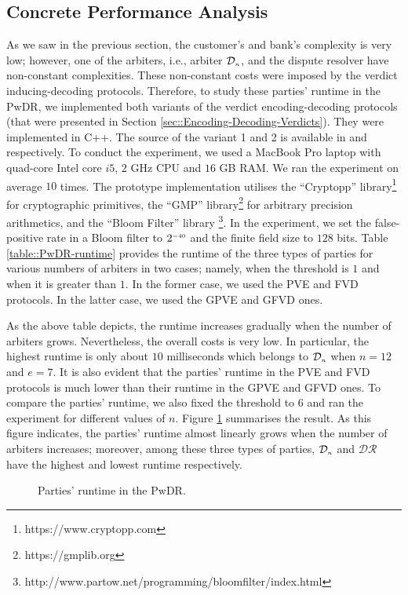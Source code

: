 \subsection{Concrete Performance Analysis}

As we saw  in the previous section, the customer's and bank's complexity is very low; however, one of the arbiters, i.e., arbiter $\mathcal{D}_{\scriptscriptstyle n}$, and the dispute resolver have non-constant complexities.  These non-constant  costs were  imposed by the verdict inducing-decoding protocols. Therefore, to study these parties' runtime in the PwDR, we  implemented both variants of the verdict encoding-decoding protocols (that were presented in Section  \ref{sec::Encoding-Decoding-Verdicts}). They  were implemented in C++. The source of the variant 1 and 2 is available in \cite{variant-1} and \cite{variant-2} respectively. To conduct the experiment, we used a MacBook Pro laptop with quad-core Intel core $i5$, $2$ GHz CPU and $16$ GB RAM. We ran the experiment on average $10$ times. The prototype implementation utilises the ``Cryptopp'' library\footnote{https://www.cryptopp.com}  for cryptographic primitives, the ``GMP'' library\footnote{https://gmplib.org} for arbitrary precision arithmetics, and the ``Bloom Filter'' library \footnote{http://www.partow.net/programming/bloomfilter/index.html}. In the experiment, we set the false-positive rate in a Bloom filter to $2^{\scriptscriptstyle -40}$ and  the finite field size to $128$ bits. Table \ref{table::PwDR-runtime} provides the runtime of the three types of parties for various numbers of arbiters in two cases; namely, when the threshold is $1$ and when it is greater than $1$. In the former case, we used the PVE and FVD protocols.  In the latter case, we used the GPVE and GFVD ones. 

\vspace{-5mm}

\vspace{-3mm}

As the above table depicts, the runtime increases gradually when the number of arbiters grows. Nevertheless, the overall costs is very low. In particular, the highest runtime is only about $10$ milliseconds which belongs to $\mathcal{D}_{\scriptscriptstyle n}$ when $n=12$ and $e=7$. It is also evident that the parties' runtime in the PVE and FVD protocols is much lower than their runtime in the GPVE and GFVD ones. To compare the  parties' runtime, we also fixed the threshold to $6$ and ran the experiment for different values of $n$. Figure  \ref{plot::runtime} summarises the result. As this figure indicates, the parties' runtime almost linearly grows when the number of arbiters increases; moreover, among these three types of parties, $\mathcal{D}_{\scriptscriptstyle n}$ and $\mathcal{DR}$ have the highest and lowest runtime respectively. 




\vspace{-2mm}

\begin{figure}[!htb]
\centering
{}
\caption{\small Parties' runtime in the PwDR.}\label{plot::runtime}
\end{figure}



\clearpage






